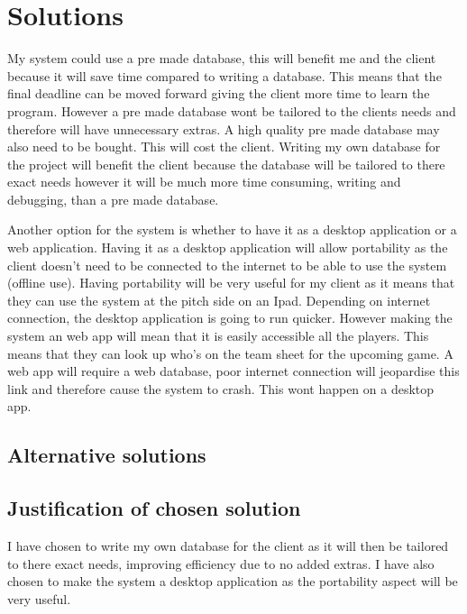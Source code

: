 \section{Solutions}
My system could use a pre made database, this will benefit me and the client because it will save time compared to writing a database. This means that the final deadline can be moved forward giving the client more time to learn the program.  However a pre made database wont be tailored to the clients needs and therefore will have unnecessary extras. A high quality pre made database may also need to be bought. This will cost the client. Writing my own database for the project will benefit the client because the database will be tailored to there exact needs however it will be much more time consuming, writing and debugging, than a pre made database.

Another option for the system is whether to have it as a desktop application or a web application. Having it as a desktop application will allow portability as the client doesn't need to be connected to the internet to be able to use the system (offline use). Having portability will be very useful for my client as it means that they can use the system at the pitch side on an Ipad. Depending on internet connection, the desktop application is going to run quicker. However making the system an web app will mean that it is easily accessible all the players. This means that they can look up who's on the team sheet for the upcoming game. A web app will require a web database, poor internet connection will jeopardise this link and therefore cause the system to crash. This wont happen on a desktop app. 
\subsection{Alternative solutions}

\subsection{Justification of chosen solution}
I have chosen to write my own database for the client as it will then be tailored to there exact needs, improving efficiency due to no added extras. I have also chosen to make the system a desktop application as the portability aspect will be very useful.
